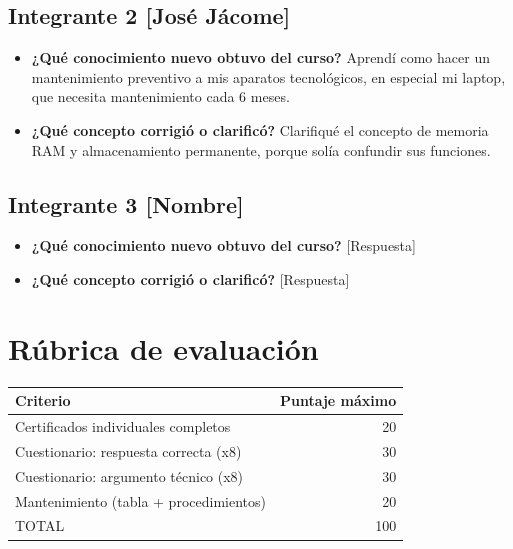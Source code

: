 \documentclass{article}
\begin{document}
\subsection{Integrante 2 [José Jácome]}
\label{sec:org158b675}
\begin{itemize}
\item \textbf{¿Qué conocimiento nuevo obtuvo del curso?} Aprendí como hacer un
mantenimiento preventivo a mis aparatos tecnológicos, en especial
mi laptop, que necesita mantenimiento cada 6 meses.
\item \textbf{¿Qué concepto corrigió o clarificó?} Clarifiqué el concepto de
memoria RAM y almacenamiento permanente, porque solía confundir
sus funciones.
\end{itemize}

\subsection{Integrante 3 [Nombre]}
\label{sec:orgb10d79c}
\begin{itemize}
\item \textbf{¿Qué conocimiento nuevo obtuvo del curso?} [Respuesta]
\item \textbf{¿Qué concepto corrigió o clarificó?} [Respuesta]
\end{itemize}

\section{Rúbrica de evaluación}
\label{sec:org50a550e}

\begin{center}
\begin{tabular}{lr}
Criterio & Puntaje máximo\\[0pt]
\hline
Certificados individuales completos & 20\\[0pt]
Cuestionario: respuesta correcta (x8) & 30\\[0pt]
Cuestionario: argumento técnico (x8) & 30\\[0pt]
Mantenimiento (tabla + procedimientos) & 20\\[0pt]
TOTAL & 100\\[0pt]
\end{tabular}
\end{center}
\end{document}
